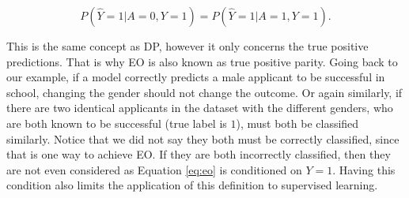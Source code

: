 \begin{equation} \label{eq:eo}
P(\hat{Y} = 1 | A = 0, Y = 1) = P(\hat{Y} = 1 | A = 1 , Y = 1).
\end{equation}

This is the same concept as DP, however it only concerns the true positive predictions. That is why EO is also known as true positive parity. Going back to our example, if a model correctly predicts a male applicant to be successful in school, changing the gender should not change the outcome. Or again similarly, if there are two identical applicants in the dataset with the different genders, who are both known to be successful (true label is $1$), must both be classified similarly. Notice that we did not say they both must be correctly classified, since that is one way to achieve EO. If they are both incorrectly classified, then they are not even considered as Equation \ref{eq:eo} is conditioned on $Y=1$. Having this condition also limits the application of this definition to supervised learning.